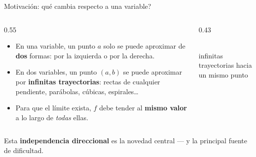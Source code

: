 \documentclass[11pt,aspectratio=169]{beamer}
\begin{document}
\begin{frame}{Motivación: \textquestiondown{}qué cambia respecto a una variable?}
  \begin{columns}
    \begin{column}{0.55\textwidth}
      \begin{itemize}
        \item En una variable, un punto $a$ solo se puede aproximar de \textbf{dos} formas: por la izquierda o por la derecha.
        \pause
        \item En dos variables, un punto $(a,b)$ se puede aproximar por \textbf{infinitas trayectorias}: rectas de cualquier pendiente, parábolas, cúbicas, espirales\dots
        \pause
        \item Para que el límite exista, $f$ debe tender al \textbf{mismo valor} a lo largo de \emph{todas} ellas.
      \end{itemize}
    \end{column}
    \begin{column}{0.43\textwidth}
      \centering
      \\[4pt]
      {\footnotesize\color{gray60} infinitas trayectorias hacia un mismo punto}
    \end{column}
  \end{columns}
  \vspace{4pt}
  \pause
  \begin{center}\small\color{tealx} Esta \textbf{independencia direccional} es la novedad central --- y la principal fuente de dificultad.\end{center}
\end{frame}
\end{document}
